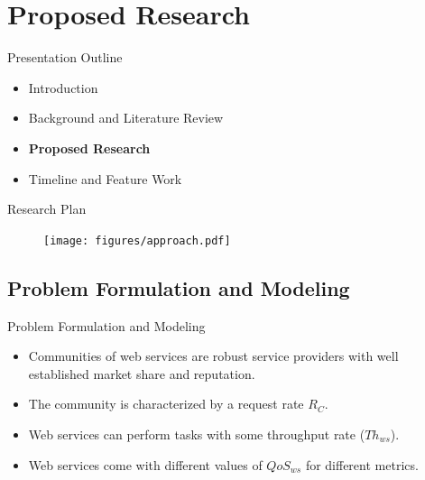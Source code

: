 \documentclass{beamer}
\begin{document}


\section{Proposed Research}
\begin{frame}{Presentation Outline}
    \begin{itemize}
     	\itemsep=.5cm
    	\item Introduction
    	\item Background and Literature Review
    	\item {\bf Proposed Research}
    	\item Timeline and Feature Work
    \end{itemize}
\end{frame}


\begin{frame}{Research Plan}
    \begin{figure}[htbp]
        \centering
        \texttt{[image: figures/approach.pdf]}
    \end{figure}
\end{frame}


\subsection{Problem Formulation and Modeling}

\begin{frame}{Problem Formulation and Modeling}
    \begin{itemize}
        \item Communities of web services are robust service providers with well established market share and reputation.
        \item The community is characterized by a request rate $R_C$.
        \item Web services can perform tasks with some throughput rate ($Th_{ws}$).
        \item Web services come with different values of $QoS_{ws}$ for different metrics.
    \end{itemize}
\end{frame}
\end{document}
